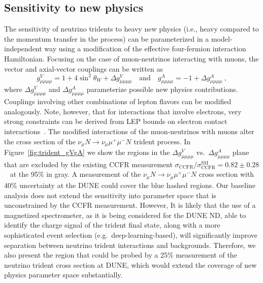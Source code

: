 \subsection{Sensitivity to new physics} 
The sensitivity of neutrino tridents to heavy new physics (i.e., heavy compared to the momentum transfer in the process) can be parameterized in a model-independent way using a modification of the effective four-fermion interaction Hamiltonian. Focusing on the case of muon-neutrinos interacting with muons, the vector and axial-vector couplings can be written as
\begin{equation}
g_{\mu\mu\mu\mu}^V = 1 + 4 \sin^2\theta_W + \Delta g_{\mu\mu\mu\mu}^V \quad \mathrm{and} \quad g_{\mu\mu\mu\mu}^A = -1 + \Delta g_{\mu\mu\mu\mu}^A ~,
\end{equation}
where $\Delta g_{\mu\mu\mu\mu}^V$ and $\Delta g_{\mu\mu\mu\mu}^A$ parameterize possible new physics contributions. Couplings involving other combinations of lepton flavors can be modified analogously. Note, however, that for interactions that involve electrons, very strong constraints can be derived from LEP bounds on electron contact interactions~\cite{Schael:2013ita}. The modified interactions of the muon-neutrinos with muons alter the cross section of the $\nu_\mu N \to \nu_\mu \mu^+\mu^- N$ trident process. In Figure~\ref{fig:trident_gVgA} we show the regions in the $\Delta g^V_{\mu\mu\mu\mu}$ vs.\ $\Delta g^A_{\mu\mu\mu\mu}$ plane that are excluded by the existing CCFR measurement $\sigma_\text{CCFR} / \sigma_\text{CCFR}^\text{SM} = 0.82 \pm 0.28$~\cite{Mishra:1991bv} at the 95\%  in gray. A measurement of the $\nu_\mu N \to \nu_\mu \mu^+\mu^- N$ cross section with $40\%$ uncertainty at the DUNE   could cover the blue hashed regions. Our baseline analysis does not extend the sensitivity into parameter space that is unconstrained by the CCFR measurement. However, It is likely that the use of a magnetized spectrometer, as it is being considered for the DUNE ND, able to identify the charge signal of the trident final state, along with a more sophisticated  event selection (e.g.\ deep-learning-based), will significantly improve separation between neutrino trident interactions and backgrounds. Therefore, we also present the region that could be probed by a 25\% measurement of the neutrino trident cross section at DUNE, which would extend the coverage of new physics parameter space substantially.

